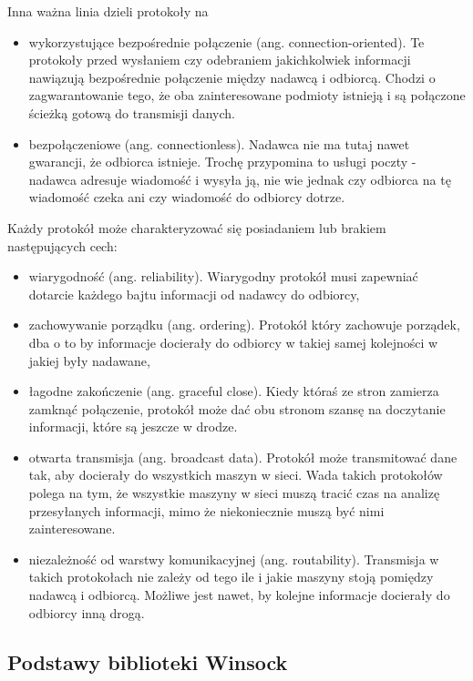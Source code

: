 Inna ważna linia dzieli protokoły na 
\begin{itemize}
  \item wykorzystujące bezpośrednie połączenie (ang. connection-oriented). 
        Te protokoły przed wysłaniem czy odebraniem jakichkolwiek informacji 
	nawiązują bezpośrednie połączenie między nadawcą i odbiorcą. Chodzi o 
	zagwarantowanie tego, że oba zainteresowane podmioty istnieją i są 
	połączone ścieżką gotową do transmisji danych. 
  \item bezpołączeniowe (ang. connectionless). Nadawca nie ma tutaj nawet gwarancji, 
        że odbiorca istnieje. Trochę przypomina to usługi poczty - nadawca adresuje 
	wiadomość i wysyła ją, nie wie jednak czy odbiorca na tę wiadomość czeka ani 
	czy wiadomość do odbiorcy dotrze. 
\end{itemize}

Każdy protokół może charakteryzować się posiadaniem lub brakiem następujących cech:
\begin{itemize}
  \item wiarygodność (ang. reliability). Wiarygodny protokół musi zapewniać dotarcie każdego 
        bajtu informacji od nadawcy do odbiorcy, 
  \item zachowywanie porządku (ang. ordering). Protokół który zachowuje porządek, dba o to 
        by informacje docierały do odbiorcy w takiej samej kolejności w jakiej były nadawane, 
  \item łagodne zakończenie (ang. graceful close). Kiedy któraś ze stron zamierza zamknąć 
        połączenie, protokół może dać obu stronom szansę na doczytanie informacji, które są jeszcze w drodze. 
  \item otwarta transmisja (ang. broadcast data). Protokół może transmitować dane tak, aby 
        docierały do wszystkich maszyn w sieci. Wada takich protokołów polega na tym, że 
	wszystkie maszyny w sieci muszą tracić czas na analizę przesyłanych informacji, mimo 
	że niekoniecznie muszą być nimi zainteresowane. 
  \item niezależność od warstwy komunikacyjnej (ang. routability). Transmisja w takich protokołach 
        nie zależy od tego ile i jakie maszyny stoją pomiędzy nadawcą i odbiorcą. 
	Możliwe jest nawet, by kolejne informacje docierały do odbiorcy inną drogą. 
\end{itemize}

\subsection{Podstawy biblioteki Winsock}


